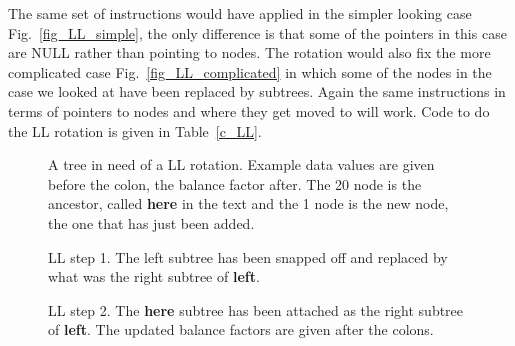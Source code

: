 \documentclass[11pt,a4paper]{scrartcl}
\begin{document}
The same set of instructions would have applied in the simpler looking
case Fig.~\ref{fig_LL_simple}, the only difference is that some of the
pointers in this case are NULL rather than pointing to nodes. The
rotation would also fix the more complicated case
Fig.~\ref{fig_LL_complicated} in which some of the nodes in the case
we looked at have been replaced by subtrees. Again the same instructions in
terms of pointers to nodes and where they get moved to will work. Code
to do the LL rotation is given in Table~\ref{c_LL}.

\begin{figure}
\begin{center}
\end{center}
\caption{A tree in need of a LL rotation. Example data values are
  given before the colon, the balance factor after. The 20 node is the
  ancestor, called \textbf{here} in the text and the 1 node is the new
  node, the one that has just been added.\label{fig_LL}}
\end{figure}

\begin{figure}
\begin{center}
\end{center}
\caption{LL step 1. The left subtree has been snapped off and replaced
  by what was the right subtree of \textbf{left}.\label{fig_LL_1}}
\end{figure}

\begin{figure}
\begin{center}
\end{center}
\caption{LL step 2. The \textbf{here} subtree has been attached as the
  right subtree of \textbf{left}. The updated balance factors are given
  after the colons.\label{fig_LL_2}}
\end{figure}
\end{document}
